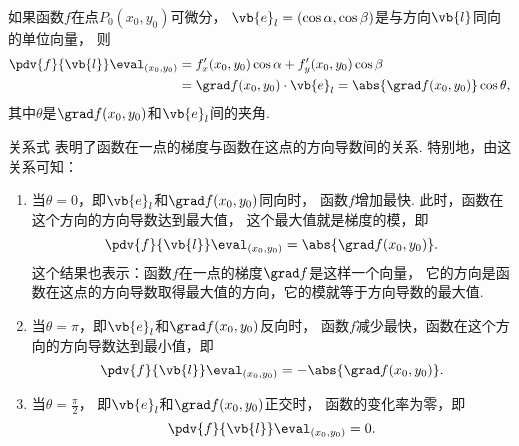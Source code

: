 \begin{theorem}\label{theorem:多元函数微分法.方向导数与梯度的关系}
如果函数\(f\)在点\(P_0(x_0,y_0)\)可微分，
\(\vb{e}_l=(\cos\alpha,\cos\beta)\)是与方向\(\vb{l}\)同向的单位向量，
则\begin{equation}\label{equation:多元函数微分法.方向导数与梯度的关系}
	\begin{split}
		\pdv{f}{\vb{l}}\eval_{(x_0,y_0)}
		&= f'_x(x_0,y_0) \cos\alpha + f'_y(x_0,y_0) \cos\beta \\
		&= \grad f(x_0,y_0) \cdot \vb{e}_l
		= \abs{\grad f(x_0,y_0)} \cos\theta,
	\end{split}
\end{equation}
其中\(\theta\)是\(\grad f(x_0,y_0)\)和\(\vb{e}_l\)间的夹角.
\end{theorem}
关系式 
表明了函数在一点的梯度与函数在这点的方向导数间的关系.
特别地，由这关系可知：
\begin{enumerate}
	\item 当\(\theta=0\)，即\(\vb{e}_l\)和\(\grad f(x_0,y_0)\)同向时，
	函数\(f\)增加最快.
	此时，函数在这个方向的方向导数达到最大值，
	这个最大值就是梯度的模，即\begin{equation*}
		\pdv{f}{\vb{l}}\eval_{(x_0,y_0)} = \abs{\grad f(x_0,y_0)}.
	\end{equation*}
	这个结果也表示：函数\(f\)在一点的梯度\(\grad f\)是这样一个向量，
	它的方向是函数在这点的方向导数取得最大值的方向，它的模就等于方向导数的最大值.

	\item 当\(\theta=\pi\)，即\(\vb{e}_l\)和\(\grad f(x_0,y_0)\)反向时，
	函数\(f\)减少最快，函数在这个方向的方向导数达到最小值，即\begin{equation*}
		\pdv{f}{\vb{l}}\eval_{(x_0,y_0)} = -\abs{\grad f(x_0,y_0)}.
	\end{equation*}

	\item 当\(\theta=\frac{\pi}{2}\)，
	即\(\vb{e}_l\)和\(\grad f(x_0,y_0)\)正交时，
	函数的变化率为零，即\begin{equation*}
		\pdv{f}{\vb{l}}\eval_{(x_0,y_0)} = 0.
	\end{equation*}
\end{enumerate}

